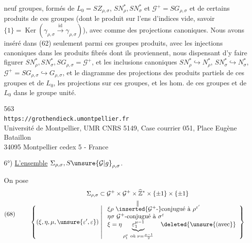 
neuf groupes,  formés de $L_{0}=SZ_{\rho,\sigma}$, $SN_{\rho}^{*},SN_{\sigma}^{*}$ et $\mathcal{G}^{+}=SG_{\rho,\sigma}$ et de certains produits de ces groupes (dont le produit sur l'ens d'indices vide, savoir $\{1\}=\operatorname{Ker}(\gamma_{\rho,\sigma}\xrightarrow{\mathrm{id}}\gamma_{\rho,\sigma})$), avec comme  des projections canoniques. Nous avons inséré dans (62) seulement  parmi ces groupes produits, avec les injections canoniques dans les produits fibrés dont ils proviennent,  nous dispensant d'y faire figurer  $SN_{\rho}^{*},SN_{\sigma}^{*},SG_{\rho,\sigma}=\mathcal{G}^{+}$, et les inclusions canoniques $SN_{\rho}^{*}\hookrightarrow N_{\rho}^{*}$, $SN_{\sigma}^{*}\hookrightarrow N_{\sigma}^{*}$, $\mathcal{G}^{+}=SG_{\rho,\sigma}\hookrightarrow G_{\rho,\sigma}$, et le  diagramme  des projections des produits partiels de ces groupes et de $L_{0}$,   les projections sur ces  groupes, et les hom. de ces groupes et de $L_{0}$ dans le groupe unité.


{\small
\begin{center}
563\\
\texttt{https://grothendieck.umontpellier.fr}\\
Université de Montpellier, UMR CNRS 5149, Case courrier 051, Place Eugène Bataillon\\
34095 Montpellier cedex 5 - France
\end{center}
}


6°) \uline{L'ensemble} $\Sigma_{\rho,\sigma},S\unsure{\mathcal{G}|g}_{\rho,\sigma}$.\par\nobreak
On pose
\[
\text{(68)}\qquad
\begin{gathered}
\Sigma_{\rho,\sigma}\subset\mathcal{G}^{+}\times\mathcal{G}^{+}\times\widehat{\mathbb Z}^{*}\times\{\pm1\}\times\{\pm1\}\\
\begin{array}{c}
\Vert\\[-0.4em]
\displaystyle
\left\{(\xi,\eta,\mu,\unsure{\varepsilon',\varepsilon})\;\middle|\;
\begin{array}{l}
\xi\rho\ \inserted{\mathcal{G}^{+}\text{-}}\text{conjugué à }\rho^{\varepsilon'}\\
\eta\sigma\ \mathcal{G}^{+}\text{-conjugué à }\sigma^{\varepsilon}\\
\xi=\eta\underbrace{\varepsilon_{1}^{\mu-1}}_{\rho_{1}^{\nu}\ \text{où }\nu=\frac{\mu-1}{2}}\quad\deleted{\unsure{\text{(avec}}}
\end{array}\right\}
\end{array}
\end{gathered}
\]

